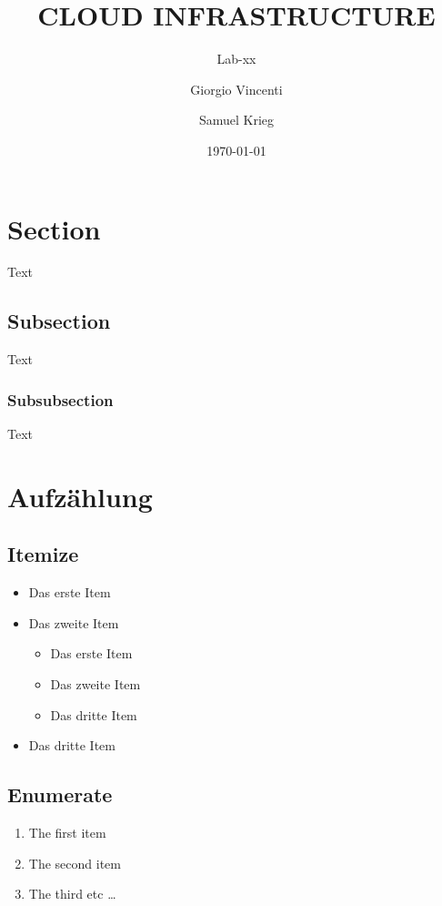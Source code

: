 \documentclass[a4,12pt]{scrartcl}
\title{CLOUD INFRASTRUCTURE}
\subtitle{Lab-xx}
\author{Giorgio Vincenti \and Samuel Krieg}
\date{\today}
\begin{document}
\clearpage\maketitle
\thispagestyle{empty}
\tableofcontents
\newpage

\section{Section}
Text


\subsection{Subsection}
Text


\subsubsection{Subsubsection}
Text

\section{Aufzählung}
\subsection{Itemize}
\begin{itemize}
\item Das erste Item
\item Das zweite Item
\begin{itemize}
\item Das erste Item
\item Das zweite Item
\item Das dritte Item
\end{itemize}
\item Das dritte Item
\end{itemize}

\subsection{Enumerate}
\begin{enumerate}
  \item The first item
  \item The second item
  \item The third etc \ldots
\end{enumerate}
\end{document}
